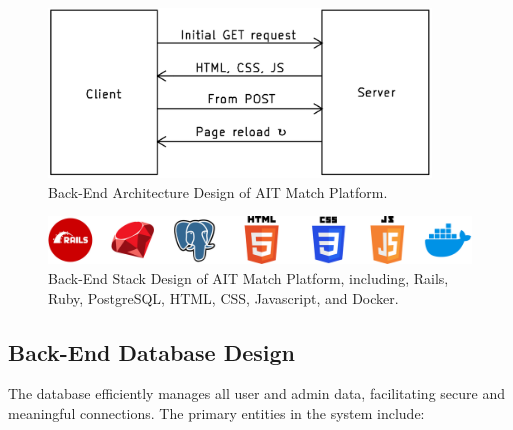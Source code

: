         \begin{figure}[H]
            \centering
            \captionsetup{justification=centering, singlelinecheck=false, labelsep=space}
            \includegraphics[width=4in]{figures/kicad-mpa-architect.png} %
            \caption{Back-End Architecture Design of AIT Match Platform.}
            \label{fig:mpa}
        \end{figure}
        
        \begin{figure}[H]
            \centering
            \captionsetup{justification=centering, singlelinecheck=false, labelsep=space}
            \includegraphics[width=6in]{figures/stack-design.png} %
            \caption{Back-End Stack Design of AIT Match Platform, including, Rails, Ruby, PostgreSQL, HTML, CSS, Javascript, and Docker.}
            \label{fig:stack}
        \end{figure}   
    \clearpage
    \subsection{Back-End Database Design}
        The database efficiently manages all user and admin data, facilitating secure and meaningful connections. The primary entities in the system include:
        
